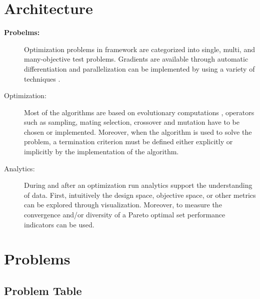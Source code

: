 \documentclass{article}
\begin{document}
\section{Architecture}
\begin{description}
    \item[\bf{Probelms:}]
    Optimization problems in framework
    are categorized into single, multi, and many-objective
    test problems. Gradients are available through automatic
    differentiation and parallelization can be implemented
    by using a variety of techniques \cite{Blank2020}.
    \item[Optimization:] Most of the algorithms are based
    on evolutionary computations \cite{Blank2020}, operators such as sampling, mating selection, crossover and mutation have to
    be chosen or implemented. Moreover, when the algorithm is
    used to solve the problem, a termination criterion must
    be defined either explicitly or implicitly by the implementation of the algorithm.
    \item[Analytics:]  During and after an optimization run analytics support the understanding of data\cite{Blank2020}. First, intuitively the design space, objective space, or other metrics can be explored through visualization. Moreover, to
    measure the convergence and/or diversity of a Pareto optimal set performance indicators can be used.
\end{description}

\section{Problems}
\subsection{Problem Table}
\end{document}

